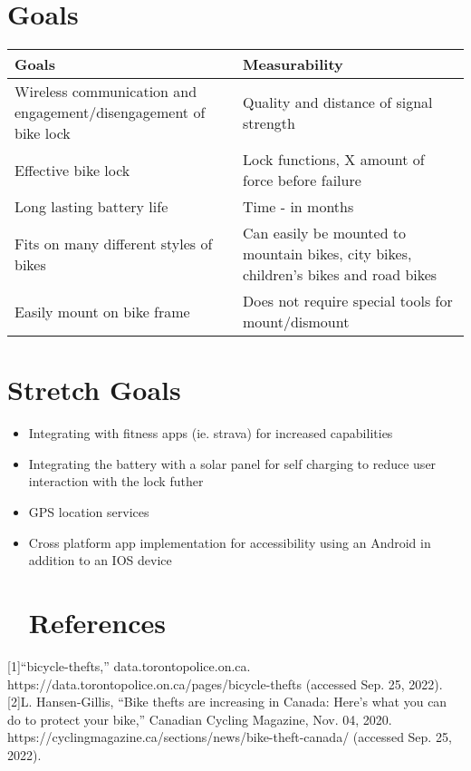 \documentclass{article}
\begin{document}
\section{Goals}
\begin{table}[hp]
  \begin{center}
    \begin{tabular}{| p{0.5\linewidth} | p{0.5\linewidth} |}
    \hline
      \textbf{Goals} & \textbf{Measurability}\\
      \hline
      Wireless communication and engagement/disengagement of bike lock  & Quality and distance of signal strength\\
      \hline
      Effective bike lock  & Lock functions, X amount of force before failure\\
      \hline
      Long lasting battery life  & Time - in months \\
      \hline
      Fits on many different styles of bikes & Can easily be mounted to mountain bikes, city bikes, children's bikes and road bikes \\
      \hline
      Easily mount on bike frame & Does not require special tools for mount/dismount\\
      \hline
    \end{tabular}
  \end{center}
\end{table}

\section{Stretch Goals}
\begin{itemize}
\item Integrating with fitness apps (ie. strava) for increased capabilities
\item Integrating the battery with a solar panel for self charging to reduce user interaction with the lock futher
\item GPS location services
\item Cross platform app implementation for accessibility using an Android in addition to an IOS device
\section{References}
\end{itemize}

[1]“bicycle-thefts,” data.torontopolice.on.ca. https://data.torontopolice.on.ca/pages/bicycle-thefts (accessed Sep. 25, 2022).
[2]L. Hansen-Gillis, “Bike thefts are increasing in Canada: Here’s what you can do to protect your bike,” Canadian Cycling Magazine, Nov. 04, 2020. https://cyclingmagazine.ca/sections/news/bike-theft-canada/ (accessed Sep. 25, 2022).
‌
‌
\end{document}
